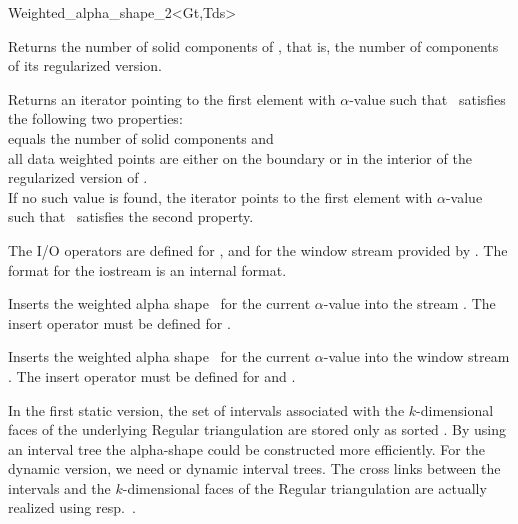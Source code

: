 \begin{ccClassTemplate} {Weighted_alpha_shape_2<Gt,Tds>}

{Returns the number of solid components of \ccVar, that is, the number of components of its regularized version.}

{Returns an iterator pointing to the first element with $\alpha$-value
such that \ccVar\ satisfies the following two properties:\\
 equals the number of solid components and \\
all data weighted points are either on the boundary or in the interior of the regularized version of \ccVar.\\
If no such value is found, the iterator points to the first element with 
$\alpha$-value such that \ccVar\ satisfies the second property.}

The I/O operators are defined for , and for
the window stream provided by \cgal. The format for the iostream
is an internal format. 


{Inserts the weighted alpha shape \ccVar\ for the current $\alpha$-value into the stream .
\ccPrecond The insert operator must be defined for .}



{Inserts the weighted alpha shape \ccVar\ for the current $\alpha$-value into the window stream .
\ccPrecond The insert operator must be defined for  and .}
\end{ccClassTemplate}

\ccImplementation
In the first static version, the set of intervals associated with the
$k$-dimensional faces of the underlying Regular triangulation are
stored only as sorted . By using an interval tree the
alpha-shape could be constructed more efficiently. For the dynamic
version, we need  or dynamic interval trees. The
cross links between the intervals and the $k$-dimensional faces of the
Regular triangulation are actually realized using
 resp.\ .

